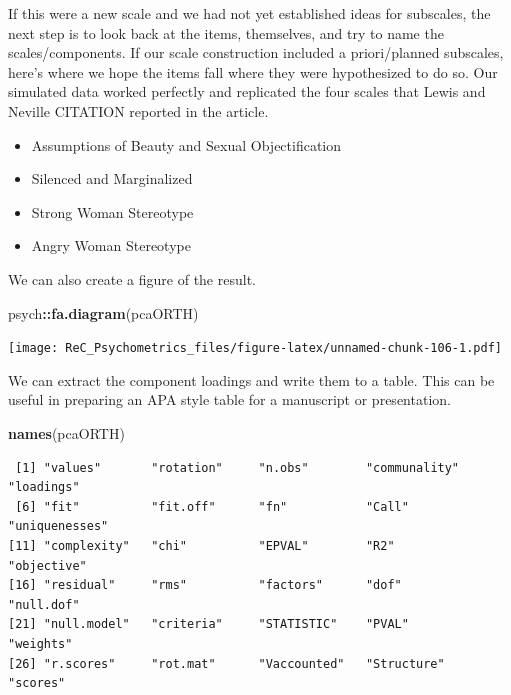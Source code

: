 \documentclass[
  english,
]{book}
\newenvironment{Shaded}{\begin{snugshade}}{\end{snugshade}}
\newcommand{\KeywordTok}[1]{\textcolor[rgb]{0.13,0.29,0.53}{\textbf{#1}}}
\newcommand{\NormalTok}[1]{#1}
\newcommand{\OperatorTok}[1]{\textcolor[rgb]{0.81,0.36,0.00}{\textbf{#1}}}
\providecommand{\tightlist}{%
  \setlength{\itemsep}{0pt}\setlength{\parskip}{0pt}}
\begin{document}
If this were a new scale and we had not yet established ideas for subscales, the next step is to look back at the items, themselves, and try to name the scales/components. If our scale construction included a priori/planned subscales, here's where we hope the items fall where they were hypothesized to do so. Our simulated data worked perfectly and replicated the four scales that Lewis and Neville CITATION reported in the article.

\begin{itemize}
\tightlist
\item
  Assumptions of Beauty and Sexual Objectification
\item
  Silenced and Marginalized
\item
  Strong Woman Stereotype
\item
  Angry Woman Stereotype
\end{itemize}

We can also create a figure of the result.

\begin{Shaded}
\begin{Highlighting}[]
\NormalTok{psych}\OperatorTok{::}\KeywordTok{fa.diagram}\NormalTok{(pcaORTH)}
\end{Highlighting}
\end{Shaded}

\texttt{[image: ReC\_Psychometrics\_files/figure-latex/unnamed-chunk-106-1.pdf]}

We can extract the component loadings and write them to a table. This can be useful in preparing an APA style table for a manuscript or presentation.

\begin{Shaded}
\begin{Highlighting}[]
\KeywordTok{names}\NormalTok{(pcaORTH)}
\end{Highlighting}
\end{Shaded}

\begin{verbatim}
 [1] "values"       "rotation"     "n.obs"        "communality"  "loadings"    
 [6] "fit"          "fit.off"      "fn"           "Call"         "uniquenesses"
[11] "complexity"   "chi"          "EPVAL"        "R2"           "objective"   
[16] "residual"     "rms"          "factors"      "dof"          "null.dof"    
[21] "null.model"   "criteria"     "STATISTIC"    "PVAL"         "weights"     
[26] "r.scores"     "rot.mat"      "Vaccounted"   "Structure"    "scores"      
\end{verbatim}
\end{document}
